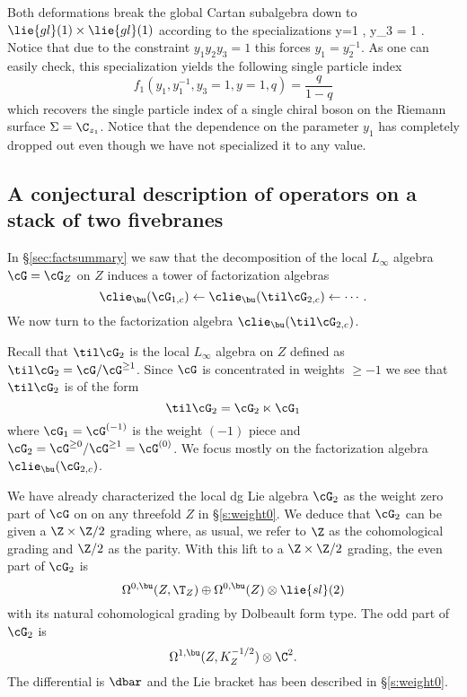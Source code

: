 Both deformations break the global Cartan subalgebra down to $\lie{gl}(1) \times \lie{gl}(1)$ according to the specializations
\beqn\label{eqn:special1}
y=1 , \quad y_3 = 1 .
\eeqn
Notice that due to the constraint $y_1y_2y_3=1$ this forces $y_1 = y_2^{-1}$.
As one can easily check, this specialization yields the following single particle index
\[
f_{1}(y_1, y_1^{-1},y_3=1, y=1, q) = \frac{q}{1-q} 
\]
which recovers the single particle index of a single chiral boson on the Riemann surface $\Sigma = \C_{z_1}$. 
Notice that the dependence on the parameter $y_1$ has completely dropped out even though we have not specialized it to any value.

\subsection{A conjectural description of operators on a stack of two fivebranes}

In \S\ref{sec:factsummary} we saw that the decomposition of the local $L_\infty$ algebra $\cG = \cG_Z$ on $Z$ induces a tower of factorization algebras 
\[
\clie_{\bu}(\cG_{1,c}) \leftarrow \clie_{\bu}(\til \cG_{2,c}) \leftarrow \cdots .
\]
We now turn to the factorization algebra $\clie_{\bu}(\til \cG_{2,c})$.

Recall that $\til \cG_{2}$ is the local $L_\infty$ algebra on $Z$ defined as $\til \cG_{2} = \cG / \cG^{\geq 1}$. 
Since $\cG$ is concentrated in weights $\geq -1$ we see that $\til \cG_{2}$ is of the form
\[
\til \cG_2 = \cG_2 \ltimes \cG_1 
\]
where $\cG_1 = \cG^{(-1)}$ is the weight $(-1)$ piece and $\cG_2 = \cG^{\geq 0} / \cG^{\geq 1} = \cG^{(0)}$.  
We focus mostly on the factorization algebra $\clie_\bu(\cG_{2,c})$.

We have already characterized the local dg Lie algebra $\cG_{2}$ as the weight zero part of $\cG$ on on any threefold $Z$ in \S\ref{s:weight0}. 
We deduce that $\cG_2$ can be given a $\Z \times \Z/2$ grading where, as usual, we refer to $\Z$ as the cohomological grading and $\Z/2$ as the parity. 
With this lift to a $\Z \times \Z/2$ grading, the even part of $\cG_2$ is
\[
\Omega^{0,\bu}(Z, \T_Z) \oplus \Omega^{0,\bu}(Z) \otimes \lie{sl}(2) 
\]
with its natural cohomological grading by Dolbeault form type. 
The odd part of $\cG_2$ is
\[
\Omega^{1,\bu}(Z, K_Z^{-1/2}) \otimes \C^2 .
\]
The differential is $\dbar$ and the Lie bracket has been described in \S\ref{s:weight0}.

